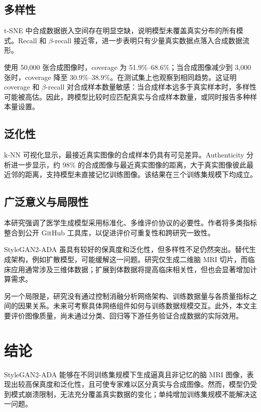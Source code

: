 \documentclass[UTF8,11pt,a4paper]{ctexart}
\begin{document}
\subsection{多样性}

t-SNE 中合成数据嵌入空间存在明显空缺，说明模型未覆盖真实分布的所有模式。Recall 和 $\beta$-recall 接近零，进一步表明只有少量真实数据点落入合成数据流形。

使用 50,000 张合成图像时，coverage 为 51.9\%--68.6\%；当合成图像减少到 3,000 张时，coverage 降至 30.9\%--38.9\%。在测试集上也观察到相同趋势。这证明 coverage 和 $\beta$-recall 对合成样本数量敏感：当合成样本远多于真实样本时，多样性可能被高估。因此，跨模型比较时应匹配真实与合成样本数量，或同时报告多种样本量设置。

\subsection{泛化性}

k-NN 可视化显示，最接近真实图像的合成样本仍具有可见差异。Authenticity 分析进一步显示，约 98\% 的合成图像与最近真实图像的距离，大于真实图像彼此最近邻的距离，支持模型未直接记忆训练图像。该结果在三个训练集规模下均成立。

\subsection{广泛意义与局限性}

本研究强调了医学生成模型采用标准化、多维评价协议的必要性。作者将多类指标整合到公开 GitHub 工具库，以促进评价可重复性和跨研究一致性。

StyleGAN2-ADA 虽具有较好的保真度和泛化性，但多样性不足仍然突出。替代生成架构，例如扩散模型，可能缓解这一问题。研究仅生成二维脑 MRI 切片，而临床应用通常涉及三维体数据；扩展到体数据将提高临床相关性，但也会显著增加计算需求。

另一个局限是，研究没有通过控制消融分析网络架构、训练数据量与各质量指标之间的因果关系。未来可考察具体网络组件如何与训练数据规模交互。此外，本文主要评价图像质量，尚未通过分类、回归等下游任务验证合成数据的实际效用。

\section{结论}

StyleGAN2-ADA 能够在不同训练集规模下生成逼真且非记忆的脑 MRI 图像，表现出较高保真度和泛化性，且可使专家难以区分真实与合成图像。然而，模型仍受到模式崩溃限制，无法充分覆盖真实数据的变化；单纯增加训练集规模不能解决这一问题。
\end{document}
